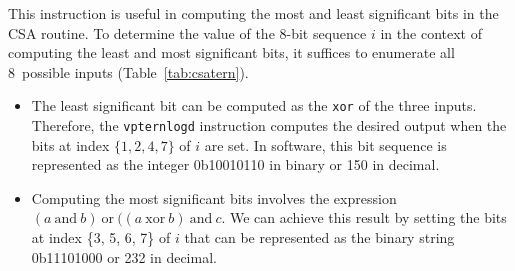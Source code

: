 \documentclass[AMA,STIX1COL]{WileyNJD-v2}
\begin{document}
This instruction is useful in computing the most and least significant bits in the CSA routine. To determine the value of the 8-bit sequence $i$ in the context of computing the least and most significant bits, it suffices to enumerate all 8~possible inputs (Table~\ref{tab:csatern}).
\begin{itemize}
\item The least significant bit can be computed as the \texttt{xor} of the three inputs. Therefore, the  
 \texttt{vpternlogd} instruction computes the desired output when the bits at index $\{1, 2, 4, 7\}$ of $i$ are set. In software, this bit sequence is represented as the integer 0b10010110 in binary or 150 in decimal.
\item Computing the most significant bits involves the expression 
$(a \mathrm{~and~} b) \mathrm{~or~} ((a \mathrm{~xor~} b) \mathrm{~and~} c$.
We can achieve this result by setting the bits at index \{3, 5, 6, 7\} of $i$ that can be represented as the binary string 0b11101000 or 232 in decimal.
\end{itemize}

\begin{table}\centering
\caption{CSA routine in the context of the  \texttt{vpternlogd} instruction\label{tab:csatern}}
\hspace{1cm}
\end{table}
\end{document}
